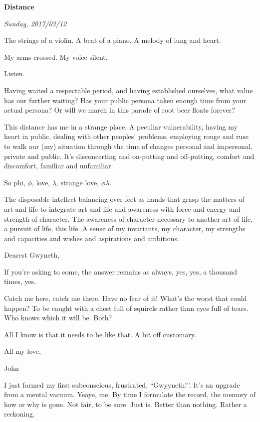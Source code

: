 

\centerline{\bf Distance}
\centerline{\it Sunday, 2017/03/12}


\vfill
\break

﻿The strings of a violin.  A beat of a piano.  A melody of lung and
heart.

My arms crossed.  My voice silent.  

Listen.

\vfill
\break

﻿Having waited a respectable period, and having established ourselves,
what value has our further waiting?  Has your public persona taken
enough time from your actual persona?  Or will we march in this parade
of root beer floats forever?

\vfill
\break

﻿This distance has me in a strange place.  A peculiar vulnerability,
having my heart in public, dealing with other peoples' problems,
employing rouge and ruse to walk our (my) situation through the time
of changes personal and impersonal, private and public.  It's
disconcerting and on-putting and off-putting, comfort and discomfort,
familiar and unfamiliar.

So phi, $\phi$, love, $\lambda$, strange love, $\phi\lambda$.  

The disposable intellect balancing over feet as hands that grasp the
matters of art and life to integrate art and life and awareness with
force and energy and strength of character.  The awareness of
character necessary to another art of life, a pursuit of life, this
life.  A sense of my invariants, my character, my strengths and
capacities and wishes and aspirations and ambitions.

\vfill
\break

﻿Dearest Gwyneth,

If you're asking to come, the answer remains as always, yes, yes, a
thousand times, yes.

Catch me here, catch me there.  Have no fear of it!  What's the worst
that could happen?  To be caught with a chest full of squirels rather
than eyes full of tears.  Who knows which it will be.  Both?

All I know is that it needs to be like that.  A bit off customary.

All my love,

John

\vfill
\break


I just formed my first subconscious, frustrated, ``Gwyyneth!''.  It's an
upgrade from a mental vacuum.  Yeaye, me.  By time I formulate the
record, the memory of how or why is gone.  Not fair, to be sure.  Just
is.  Better than nothing.  Rather a reckoning.

\vfill
\bye
